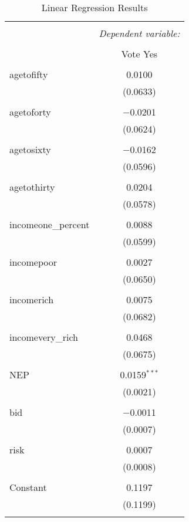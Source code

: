 \documentclass[10pt,]{article}
\begin{document}
\begin{table}[!htbp] \centering 
  \caption{Linear Regression Results} 
  \label{} 
\begin{tabular}{@{\extracolsep{5pt}}lc} 
\\[-1.8ex]\hline 
\hline \\[-1.8ex] 
 & \multicolumn{1}{c}{\textit{Dependent variable:}} \\ 
\cline{2-2} 
\\[-1.8ex] & Vote Yes \\ 
\hline \\[-1.8ex] 
 agetofifty & 0.0100 \\ 
  & (0.0633) \\ 
  & \\ 
 agetoforty & $-$0.0201 \\ 
  & (0.0624) \\ 
  & \\ 
 agetosixty & $-$0.0162 \\ 
  & (0.0596) \\ 
  & \\ 
 agetothirty & 0.0204 \\ 
  & (0.0578) \\ 
  & \\ 
 incomeone\_percent & 0.0088 \\ 
  & (0.0599) \\ 
  & \\ 
 incomepoor & 0.0027 \\ 
  & (0.0650) \\ 
  & \\ 
 incomerich & 0.0075 \\ 
  & (0.0682) \\ 
  & \\ 
 incomevery\_rich & 0.0468 \\ 
  & (0.0675) \\ 
  & \\ 
 NEP & 0.0159$^{***}$ \\ 
  & (0.0021) \\ 
  & \\ 
 bid & $-$0.0011 \\ 
  & (0.0007) \\ 
  & \\ 
 risk & 0.0007 \\ 
  & (0.0008) \\ 
  & \\ 
 Constant & 0.1197 \\ 
  & (0.1199) \\ 
  & \\ 

\end{tabular}
\end{table}
\end{document}

